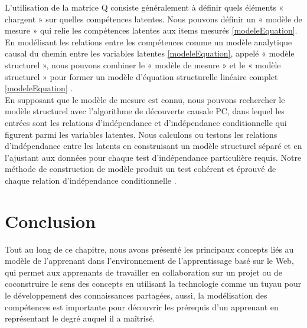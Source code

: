 L'utilisation de la matrice Q consiste généralement à définir quels éléments « chargent » sur quelles compétences latentes. Nous pouvons définir un « modèle de mesure » qui relie les compétences latentes aux items mesurés \ref{modeleEquation}. En modélisant les relations entre les compétences comme un modèle analytique causal du chemin entre les variables latentes \ref{modeleEquation}, appelé « modèle structurel », nous pouvons combiner le « modèle de mesure » et le « modèle structurel » pour former un modèle d'équation structurelle linéaire complet \ref{modeleEquation} \cite{Structural_Equations_with_Latent_Variables}. \\
En supposant que le modèle de mesure est connu, nous pouvons rechercher le modèle structurel avec l'algorithme de découverte causale PC, dans lequel les entrées sont les relations d'indépendance et d'indépendance conditionnelle qui figurent parmi les variables latentes. Nous calculons ou testons les relations d'indépendance entre les latents en construisant un modèle structurel séparé et en l'ajustant aux données pour chaque test d'indépendance particulière requis. Notre méthode de construction de modèle produit un test cohérent et éprouvé de chaque relation d'indépendance conditionnelle \cite{Discovering_Prerequisite_Relationships_among_Knowledge_Components}.

\section{Conclusion}
Tout au long de ce chapitre, nous avons présenté les principaux concepts liés au modèle de l'apprenant dans l'environnement de l'apprentissage basé sur le Web, qui permet aux apprenants de travailler en collaboration sur un projet ou de coconstruire le sens des concepts en utilisant la technologie comme un tuyau pour le développement des connaissances partagées, aussi, la modélisation des compétences est importante pour découvrir les prérequis d'un apprenant en représentant le degré auquel il a maîtrisé.








